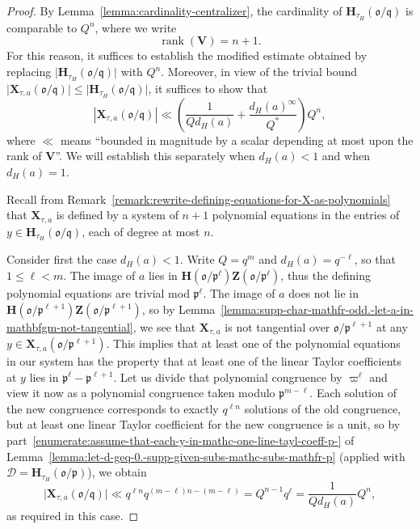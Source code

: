 \documentclass[reqno]{amsart}
\DeclareMathOperator{\rank}{rank}
\theoremstyle{plain} \newtheorem{theorem} {Theorem} \newtheorem{conjecture} {Conjecture} \newtheorem{corollary} [theorem] {Corollary} \newtheorem{proposition} [theorem] {Proposition} \newtheorem{fact} [theorem] {Fact}
\theoremstyle{definition} \newtheorem{definition} [theorem] {Definition}
\theoremstyle{itplain} %
\newcommand{\mfq}{\mathfrak{q}}
\begin{document}
\begin{proof}
  By Lemma~\ref{lemma:cardinality-centralizer}, the cardinality of $\mathbf{H}_{\tau_H}(\mathfrak{o}/\mfq)$ is comparable to $Q^{n}$, where we write
  \begin{equation*}
    \rank(\mathbf{V}) = n+1.
  \end{equation*}
  For this reason, it suffices to establish the modified estimate obtained by replacing $\lvert \mathbf{H}_{\tau_H}(\mathfrak{o}/\mfq) \rvert$ with $Q^n$.  Moreover, in view of the trivial bound $\lvert \mathbf{X}_{\tau,a}(\mathfrak{o}/\mfq) \rvert \leq \lvert \mathbf{H}_{\tau_H}(\mathfrak{o}/\mfq) \rvert$, it suffices to show that
  \begin{equation*}
    \left\lvert \mathbf{X}_{\tau,a}(\mathfrak{o}/\mfq) \right\rvert
    \ll
    \left( \frac{1}{Q d_H(a)} + \frac{{d_H(a)}^\infty }{Q^{*}} \right) Q^n,
  \end{equation*}
  where $\ll$ means ``bounded in magnitude by a scalar depending at most upon the rank of $\mathbf{V}$''.  We will establish this separately when $d_H(a) < 1$ and when $d_H(a) = 1$.

  Recall from Remark~\ref{remark:rewrite-defining-equations-for-X-as-polynomials} that $\mathbf{X}_{\tau,a}$ is defined by a system of $n+1$ polynomial equations in the entries of $y \in \mathbf{H}_{\tau_H}(\mathfrak{o}/\mfq)$, each of degree at most $n$.

  Consider first the case $d_H(a) < 1$.  Write $Q = q^m$ and $d_H(a) = q^{-\ell}$, so that $1 \leq \ell < m$.  The image of $a$ lies in $\mathbf{H}(\mathfrak{o}/\mathfrak{p}^{\ell}) \mathbf{Z}(\mathfrak{o}/\mathfrak{p}^{\ell})$, thus the defining polynomial equations are trivial mod $\mathfrak{p}^{\ell}$. The image of $a$ does not lie in $\mathbf{H}(\mathfrak{o}/\mathfrak{p}^{\ell+1}) \mathbf{Z}(\mathfrak{o}/\mathfrak{p}^{\ell+1})$, so by Lemma~\ref{lemma:supp-char-mathfr-odd.-let-a-in-mathbfgm-not-tangential}, we see that $\mathbf{X}_{\tau,a}$ is not tangential over $\mathfrak{o} / \mathfrak{p}^{\ell+1}$ at any $y \in \mathbf{X}_{\tau,a}(\mathfrak{o}/\mathfrak{p}^{\ell+1})$.  This implies that at least one of the polynomial equations in our system has the property that at least one of the linear Taylor coefficients at $y$ lies in $\mathfrak{p}^{\ell}-\mathfrak{p}^{\ell+1}$.  Let us divide that polynomial congruence by $\varpi^{\ell}$ and view it now as a polynomial congruence taken modulo $\mathfrak{p}^{m-\ell}$.  Each solution of the new congruence corresponds to exactly $q^{\ell n}$ solutions of the old congruence, but at least one linear Taylor coefficient for the new congruence is a unit, so by part~\eqref{enumerate:assume-that-each-y-in-mathc-one-line-tayl-coeff-p-} of Lemma~\ref{lemma:let-d-geq-0.-supp-given-subs-mathc-subs-mathfr-p} (applied with $\mathcal{D} = \mathbf{H}_{\tau_H}(\mathfrak{o}/\mathfrak{p})$), we obtain
  \begin{equation*}
    \lvert \mathbf{X}_{\tau,a}(\mathfrak{o}/\mfq) \rvert \ll
    q^{\ell n}
    q^{(m-\ell) n - (m-\ell)}
    = Q^{n-1} q^{\ell} = \frac{1}{Q d_H(a)} Q^n,
  \end{equation*}
  as required in this case.


\end{proof}
\end{document}
